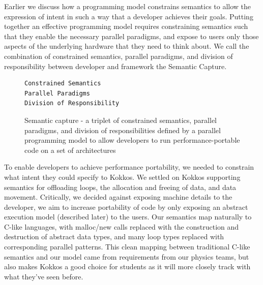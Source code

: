 Earlier we discuss how a programming model constrains semantics to allow the expression of intent in such a way that a developer achieves their goals. Putting together an effective programming model requires constraining semantics such that they enable the necessary parallel paradigms, and expose to users only those aspects of the underlying hardware that they need to think about. We call the combination of constrained semantics, parallel paradigms, and division of responsibility between developer and framework the Semantic Capture.

\begin{figure}[h]
\begin{Verbatim}[frame=leftline]
Constrained Semantics
Parallel Paradigms 
Division of Responsibility
\end{Verbatim}
\caption{Semantic capture - a triplet of constrained semantics, parallel paradigms, and division of responsibilities defined by a parallel programming model to allow developers to run performance-portable code on a set of architectures}
\label{figSemCapture}
\end{figure}


To enable developers to achieve performance portability, we needed to constrain what intent they could specify to Kokkos. We settled on Kokkos supporting semantics for offloading loops, the allocation and freeing of data, and data movement. Critically, we decided against exposing machine details to the developer, we aim to increase portability of code by only exposing an abstract execution model (described later) to the users. Our semantics map naturally to C-like languages, with malloc/new calls replaced with the construction and destruction of abstract data types, and many loop types replaced with corresponding parallel patterns. This clean mapping between traditional C-like semantics and our model came from requirements from our physics teams, but also makes Kokkos a good choice for students as it will more closely track with what they've seen before. 

